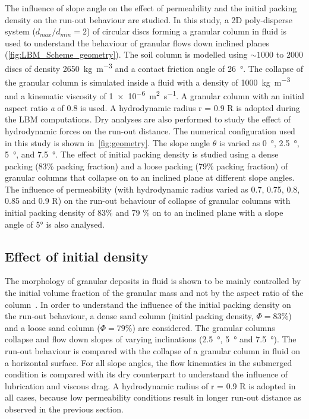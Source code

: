 The influence of slope angle on the effect of permeability and the initial 
packing density on the run-out behaviour are studied. In this study, a 2D 
poly-disperse system ($d_{max}/d_{min} = 2$) of circular discs forming a 
granular column in fluid is used to understand 
the behaviour of granular flows down inclined planes 
(\cref{fig:LBM_Scheme_geometry}). 
The soil column is modelled using $\sim 1000$ to $2000$ discs of density 
\SI{2650}{\kg\per\cubic\meter} and a contact friction angle of 
\SI{26}{\degree}. The collapse of the granular column is simulated inside a 
fluid with a density of \SI{1000}{\kg\per\cubic\meter} and a kinematic 
viscosity of \SI{1e-6}{\square\meter\per\second}. A granular column with 
an 
initial aspect ratio \textit{a} of 0.8 is used. A hydrodynamic radius r = 0.9 R 
is adopted during the LBM computations. Dry analyses are also performed to 
study the effect of hydrodynamic forces on the run-out distance. The 
numerical configuration used in this study is shown in~\cref{fig:geometry}. The 
slope angle $\theta$ is varied as \SI{0}{\degree}, \SI{2.5}{\degree}, 
\SI{5}{\degree}, and \SI{7.5}{\degree}. The effect of initial packing density 
is studied using a 
dense packing (83\% packing fraction) and a loose packing (79\% packing 
fraction) of granular columns that collapse on to an inclined plane at 
different slope angles. The influence of permeability (with hydrodynamic radius 
varied as 0.7, 0.75, 0.8, 0.85 and 0.9 R) on the run-out behaviour of collapse 
of granular columns with initial packing density of 83\% and 79 \% on to an 
inclined plane with a slope angle of 5\si{\degree} is also analysed. 


\subsection{Effect of initial density}
The morphology of granular deposits in fluid is shown to be mainly 
controlled by the initial volume fraction of the granular mass and not by the 
aspect ratio of the column~\citep{Rondon2011,Pailha2008}. In order to 
understand the influence of the initial packing density on the run-out 
behaviour, a dense sand column (initial packing density, $\Phi=83\%$) and a 
loose sand column ($\Phi=79\%$) are considered. The granular columns collapse 
and flow down slopes of varying inclinations (\SI{2.5}{\degree}, 
\SI{5}{\degree} and \SI{7.5}{\degree}). The run-out behaviour is compared with 
the collapse of a granular column in fluid on a horizontal surface. For all 
slope angles, the flow kinematics in the submerged condition is compared with 
its dry counterpart to understand the influence of lubrication and viscous 
drag. A hydrodynamic radius of r = 0.9 R is adopted in all cases, because low 
permeability conditions result in longer run-out distance as observed in the 
previous section.



